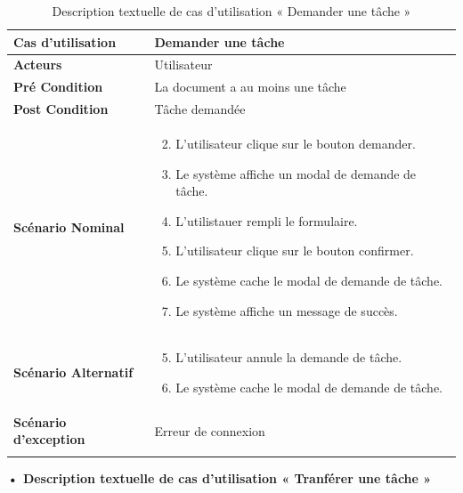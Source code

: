\begin{longtable}{|p{5cm}|p{10cm}|}
\hline
\textbf{Cas d'utilisation}&Demander une tâche\\
\hline
\textbf{Acteurs}&Utilisateur\\
\hline
\textbf{Pré Condition}&La document a au moins une tâche\\
\hline
\textbf{Post Condition}&Tâche demandée\\
\hline
\textbf{Scénario Nominal}&
\vspace{-\baselineskip}
\begin{enumerate}
    \setcounter{enumi}{1}
    \item L'utilisateur clique sur le bouton demander.
    \item Le système affiche un modal de demande de tâche.
    \item L'utilistauer rempli le formulaire.
    \item L'utilisateur clique sur le bouton confirmer.
    \item Le système cache le modal de demande de tâche.
    \item Le système affiche un message de succès.
\end{enumerate}\\
\hline
\textbf{Scénario Alternatif}&
\vspace{-\baselineskip}
\begin{enumerate}
    \setcounter{enumi}{4}
    \item L'utilisateur annule la demande de tâche.
    \item Le système cache le modal de demande de tâche.
\end{enumerate}\\
\hline
\textbf{Scénario d'exception}&Erreur de connexion\\
\hline
\caption{Description textuelle de cas d'utilisation « Demander une tâche »}
\label{tab:DescriptionTextuelleDeCasDUtilisationDemanderUneTache}
\end{longtable}


\textbf{•	Description textuelle de cas d'utilisation « Tranférer une tâche »}

